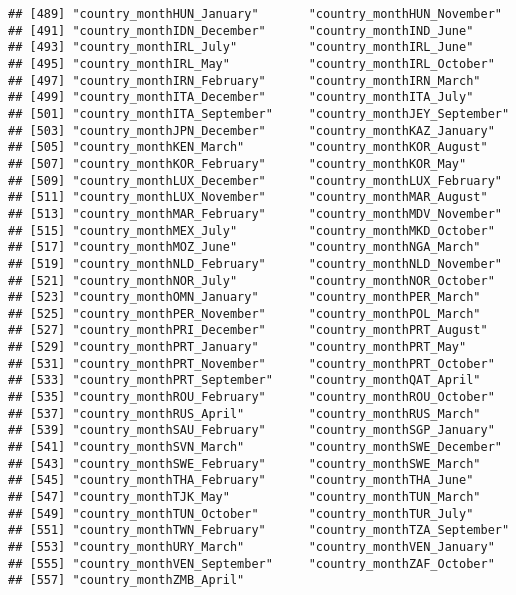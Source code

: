 \documentclass[
]{book}
\begin{document}
\begin{verbatim}
## [489] "country_monthHUN_January"       "country_monthHUN_November"     
## [491] "country_monthIDN_December"      "country_monthIND_June"         
## [493] "country_monthIRL_July"          "country_monthIRL_June"         
## [495] "country_monthIRL_May"           "country_monthIRL_October"      
## [497] "country_monthIRN_February"      "country_monthIRN_March"        
## [499] "country_monthITA_December"      "country_monthITA_July"         
## [501] "country_monthITA_September"     "country_monthJEY_September"    
## [503] "country_monthJPN_December"      "country_monthKAZ_January"      
## [505] "country_monthKEN_March"         "country_monthKOR_August"       
## [507] "country_monthKOR_February"      "country_monthKOR_May"          
## [509] "country_monthLUX_December"      "country_monthLUX_February"     
## [511] "country_monthLUX_November"      "country_monthMAR_August"       
## [513] "country_monthMAR_February"      "country_monthMDV_November"     
## [515] "country_monthMEX_July"          "country_monthMKD_October"      
## [517] "country_monthMOZ_June"          "country_monthNGA_March"        
## [519] "country_monthNLD_February"      "country_monthNLD_November"     
## [521] "country_monthNOR_July"          "country_monthNOR_October"      
## [523] "country_monthOMN_January"       "country_monthPER_March"        
## [525] "country_monthPER_November"      "country_monthPOL_March"        
## [527] "country_monthPRI_December"      "country_monthPRT_August"       
## [529] "country_monthPRT_January"       "country_monthPRT_May"          
## [531] "country_monthPRT_November"      "country_monthPRT_October"      
## [533] "country_monthPRT_September"     "country_monthQAT_April"        
## [535] "country_monthROU_February"      "country_monthROU_October"      
## [537] "country_monthRUS_April"         "country_monthRUS_March"        
## [539] "country_monthSAU_February"      "country_monthSGP_January"      
## [541] "country_monthSVN_March"         "country_monthSWE_December"     
## [543] "country_monthSWE_February"      "country_monthSWE_March"        
## [545] "country_monthTHA_February"      "country_monthTHA_June"         
## [547] "country_monthTJK_May"           "country_monthTUN_March"        
## [549] "country_monthTUN_October"       "country_monthTUR_July"         
## [551] "country_monthTWN_February"      "country_monthTZA_September"    
## [553] "country_monthURY_March"         "country_monthVEN_January"      
## [555] "country_monthVEN_September"     "country_monthZAF_October"      
## [557] "country_monthZMB_April"
\end{verbatim}
\end{document}
